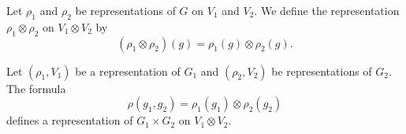 \begin{definition}
	Let \( \rho_1\) and \( \rho_2\) be representations of \( G\) on \( V_1\) and \( V_2\). We define the representation \( \rho_1\otimes \rho_2\) on \( V_1\otimes V_2\) by
	\begin{equation}
		(\rho_1\otimes \rho_2)(g)=\rho_1(g)\otimes \rho_2(g).
	\end{equation}
\end{definition}

\begin{proposition}
	Let \( (\rho_1,V_1)\) be a representation of \( G_1\) and \( (\rho_2,V_2)\) be representations of \( G_2\). The formula
	\begin{equation}
		\rho(g_1,g_2)=\rho_1(g_1)\otimes \rho_2(g_2)
	\end{equation}
	defines a representation of \( G_1\times G_2\) on \( V_1\otimes V_2\).
\end{proposition}
